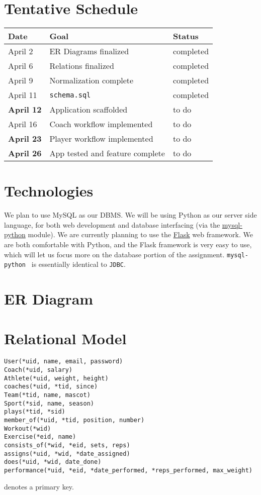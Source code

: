 \documentclass{article}
\begin{document}
    \section*{Tentative Schedule}
    \begin{tabular}{l || l | l}
        Date & Goal & Status \\
        \hline
        April 2 & ER Diagrams finalized & completed \\ 
        April 6 & Relations finalized & completed \\ 
        April 9 & Normalization complete & completed \\ 
        April 11 & {\tt schema.sql} & completed \\ 
        \textbf{April 12} & Application scaffolded & to do \\ 
        April 16 & Coach workflow implemented & to do \\ 
        \textbf{April 23} & Player workflow implemented & to do \\ 
        \textbf{April 26} & App tested and feature complete & to do \\ 
    \end{tabular}

    \section*{Technologies}
    We plan to use MySQL as our DBMS. We will be using Python as our server side language,
    for both web development and database interfacing (via the 
    \href{http://mysql-python.sourceforge.net/MySQLdb.html}{mysql-python} module). 
    We are currently planning to use the \href{http://flask.pocoo.org/}{Flask} web framework.
    We are both comfortable with Python, and the Flask framework is very easy to use, which
    will let us focus more on the database portion of the assignment. {\tt mysql-python } is
    essentially identical to {\tt JDBC}.

    \section*{ER Diagram}
    

    \section*{Relational Model}
    \begin{verbatim}
User(*uid, name, email, password)
Coach(*uid, salary)
Athlete(*uid, weight, height)
coaches(*uid, *tid, since)
Team(*tid, name, mascot)
Sport(*sid, name, season)
plays(*tid, *sid)
member_of(*uid, *tid, position, number)
Workout(*wid)
Exercise(*eid, name)
consists_of(*wid, *eid, sets, reps)
assigns(*uid, *wid, *date_assigned)
does(*uid, *wid, date_done)
performance(*uid, *eid, *date_performed, *reps_performed, max_weight)
    \end{verbatim}
{\tt *} denotes a primary key.
\end{document}
